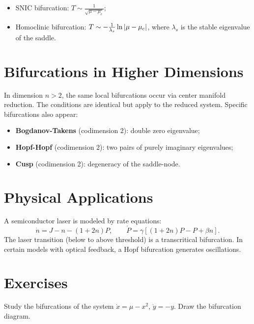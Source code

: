 \begin{theorem}
\begin{itemize}
    \item SNIC bifurcation: $T \sim \frac{1}{\sqrt{\mu - \mu_c}}$;
    \item Homoclinic bifurcation:
    $T \sim -\frac{1}{\lambda_s}\ln\left| \mu - \mu_c \right|$, where $\lambda_s$
    is the stable eigenvalue of the saddle.
\end{itemize}
\end{theorem}

\section{Bifurcations in Higher Dimensions}

\begin{remark}
In dimension $n > 2$, the same local bifurcations occur via center manifold
reduction. The conditions are identical but apply to the reduced system.
Specific bifurcations also appear:
\begin{itemize}
    \item \textbf{Bogdanov-Takens} (codimension 2): double zero eigenvalue;
    \item \textbf{Hopf-Hopf} (codimension 2): two pairs of purely imaginary
    eigenvalues;
    \item \textbf{Cusp} (codimension 2): degeneracy of the saddle-node.
\end{itemize}
\end{remark}

\section{Physical Applications}

\begin{example}[Laser]
A semiconductor laser is modeled by rate equations:
\[
    \dot{n} = J - n - (1 + 2n)P, \qquad \dot{P} = \gamma\left[(1 + 2n)P - P + \beta n\right].
\]
The laser transition (below to above threshold) is a transcritical
bifurcation. In certain models with optical feedback, a Hopf bifurcation
generates oscillations.
\end{example}

\section{Exercises}

\begin{exercise}
Study the bifurcations of the system $\dot{x} = \mu - x^2$, $\dot{y} = -y$.
Draw the bifurcation diagram.
\end{exercise}

